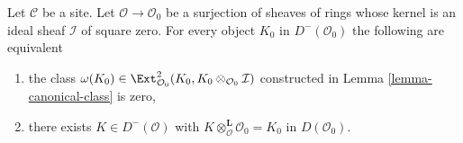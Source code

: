 \begin{lemma}
\label{lemma-canonical-class-obstruction}
Let $\mathcal{C}$ be a site. Let $\mathcal{O} \to \mathcal{O}_0$
be a surjection of sheaves of rings whose kernel is an ideal sheaf
$\mathcal{I}$ of square zero. For every object
$K_0$ in $D^-(\mathcal{O}_0)$ the following are equivalent
\begin{enumerate}
\item  the class
$\omega(K_0) \in
\Ext^2_{\mathcal{O}_0}(K_0, K_0 \otimes_{\mathcal{O}_0} \mathcal{I})$
constructed in Lemma \ref{lemma-canonical-class} is zero,
\item there exists $K \in D^-(\mathcal{O})$ with
$K \otimes_\mathcal{O}^\mathbf{L} \mathcal{O}_0 = K_0$
in $D(\mathcal{O}_0)$.
\end{enumerate}
\end{lemma}

